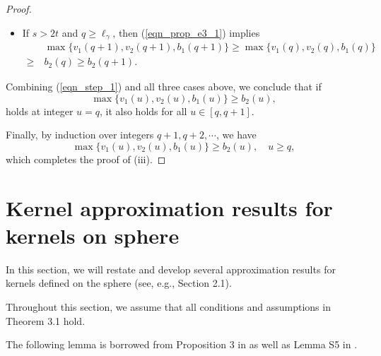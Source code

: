 \documentclass{article}
\theoremstyle{plain}
\theoremstyle{definition}
\theoremstyle{remark}
\begin{document}
\begin{appendix}
\begin{proof}
\begin{itemize}
    \item If $s>2t$ and $q \geq \ell_{\gamma}$, then (\ref{eqn_prop_e3_1}) implies 
    \begin{align*}
        &~ \max\{v_1(q+1), v_2(q+1), b_1(q+1)\} \geq \max\{v_1(q), v_2(q), b_1(q)\} \\
        \geq &~ b_2(q) \geq b_2(q+1).
    \end{align*}
\end{itemize}
Combining (\ref{eqn_step_1}) and all three cases above, we conclude that if 
$$
\max\{v_1(u), v_2(u), b_1(u)\} \geq b_2(u),
$$
holds at integer $u=q$, it also holds for all $u \in [q, q+1]$.

Finally, by induction over integers $q+1, q+2, \cdots$, we have 
$$
\max\{v_1(u), v_2(u), b_1(u)\} \geq b_2(u),\quad u \geq q,
$$
which completes the proof of (iii).
\end{proof}



















\section{Kernel approximation results for kernels on sphere}\label{append_kernel_app_sphere}


In this section, we will restate and develop several approximation results for kernels defined on the sphere (see, e.g., Section 2.1).


Throughout this section, we assume that all conditions and assumptions in Theorem 3.1 hold.





The following lemma is borrowed from Proposition 3 in \cite{ghorbani2021linearized} as well as Lemma S5 in \cite{zhang2024phase}.




\end{appendix}
\end{document}
